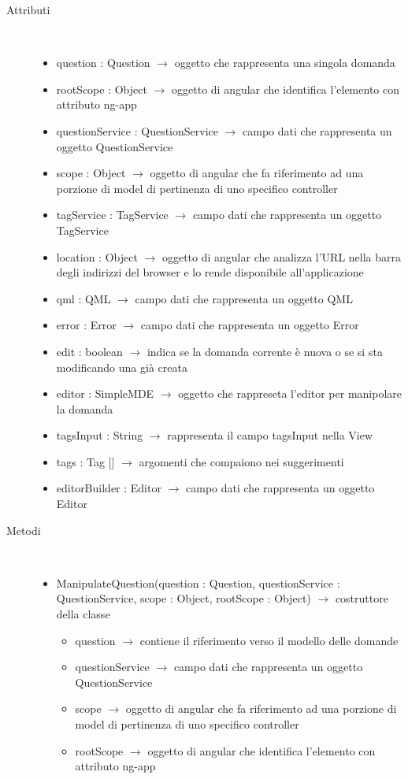 \begin{description}
\item[Attributi] \hfill \\
\vspace{-7mm}
\begin{itemize}
	\item question : Question  $\rightarrow$ oggetto che rappresenta una singola domanda
	\item rootScope : Object $\rightarrow$ oggetto di angular che identifica l’elemento con attributo ng-app
	\item questionService : QuestionService $\rightarrow$ campo dati che rappresenta un oggetto QuestionService
	\item scope : Object $\rightarrow$ oggetto di angular che fa riferimento ad una porzione di model di pertinenza di uno specifico controller
	\item tagService : TagService $\rightarrow$ campo dati che rappresenta un oggetto TagService
	\item location : Object $\rightarrow$ oggetto di angular che analizza l'URL nella barra degli indirizzi del browser e lo rende disponibile all'applicazione
	\item qml : QML $\rightarrow$ campo dati che rappresenta un oggetto QML
	\item error : Error $\rightarrow$ campo dati che rappresenta un oggetto Error
	\item edit : boolean $\rightarrow$ indica se la domanda corrente è nuova o se si sta modificando una già creata
	\item editor : SimpleMDE $\rightarrow$ oggetto che rappreseta l'editor per manipolare la domanda
	\item tagsInput : String $\rightarrow$ rappresenta il campo tagsInput nella View
	\item tags : Tag [] $\rightarrow$ argomenti che compaiono nei suggerimenti
	\item editorBuilder : Editor $\rightarrow$ campo dati che rappresenta un oggetto Editor
\end{itemize}

\item[Metodi] \hfill \\
\vspace{-7mm}
\begin{itemize}
	\item ManipulateQuestion(question : Question, questionService : QuestionService, scope : Object, rootScope : Object) $\rightarrow$ costruttore della classe\begin{itemize}
		\item question $\rightarrow$ contiene il riferimento verso il modello delle domande 
		\item questionService $\rightarrow$ campo dati che rappresenta un oggetto QuestionService
		\item scope $\rightarrow$ oggetto di angular che fa riferimento ad una porzione di model di pertinenza di uno specifico controller
		\item rootScope $\rightarrow$ oggetto di angular che identifica l’elemento con attributo ng-app
	\end{itemize}
	

\end{itemize}
\end{description}
